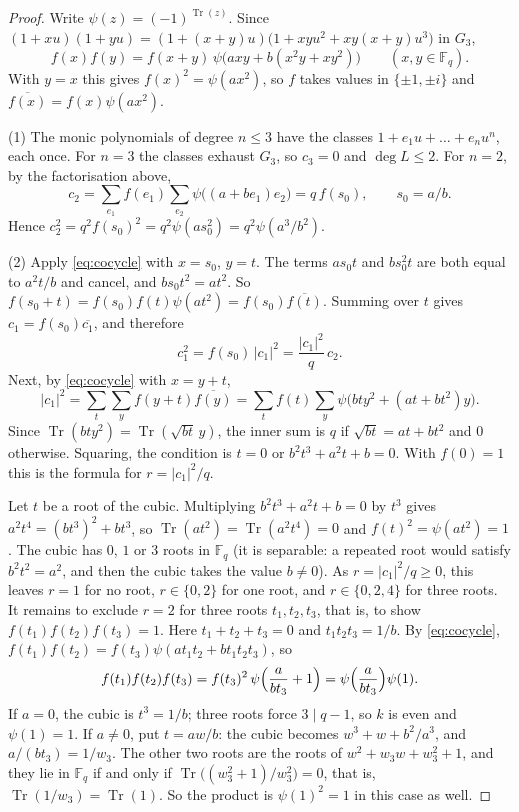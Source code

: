 \documentclass[11pt,a4paper]{amsart}
\theoremstyle{definition}
\theoremstyle{remark}
\newcommand{\F}{\mathbb{F}}
\newcommand{\Tr}{\operatorname{Tr}}
\begin{document}
\begin{proof}
Write $\psi(z)=(-1)^{\Tr(z)}$. Since
$(1+xu)(1+yu)=(1+(x+y)u)\bigl(1+xyu^2+xy(x+y)u^3\bigr)$ in $G_3$,
\begin{equation}\label{eq:cocycle}
f(x)f(y)=f(x+y)\,\psi\bigl(axy+b(x^2y+xy^2)\bigr)\qquad(x,y\in\F_q).
\end{equation}
With $y=x$ this gives $f(x)^2=\psi(ax^2)$, so $f$ takes values in $\{\pm1,\pm i\}$ and $\overline{f(x)}=f(x)\psi(ax^2)$.

(1) The monic polynomials of degree $n\le3$ have the classes $1+e_1u+\dots+e_nu^n$, each once. For $n=3$ the classes
exhaust $G_3$, so $c_3=0$ and $\deg L\le2$. For $n=2$, by the factorisation above,
\[
c_2=\sum_{e_1}f(e_1)\sum_{e_2}\psi\bigl((a+be_1)e_2\bigr)=q\,f(s_0),\qquad s_0=a/b .
\]
Hence $c_2^2=q^2f(s_0)^2=q^2\psi(as_0^2)=q^2\psi(a^3/b^2)$.

(2) Apply \eqref{eq:cocycle} with $x=s_0$, $y=t$. The terms $as_0t$ and $bs_0^2t$ are both equal to $a^2t/b$ and
cancel, and $bs_0t^2=at^2$. So $f(s_0+t)=f(s_0)f(t)\psi(at^2)=f(s_0)\overline{f(t)}$. Summing over $t$ gives
$c_1=f(s_0)\overline{c_1}$, and therefore
\[
c_1^2=f(s_0)\,|c_1|^2=\frac{|c_1|^2}{q}\,c_2 .
\]
Next, by \eqref{eq:cocycle} with $x=y+t$,
\[
|c_1|^2=\sum_{t}\sum_yf(y+t)\overline{f(y)}=\sum_tf(t)\sum_y\psi\bigl(bty^2+(at+bt^2)y\bigr).
\]
Since $\Tr(bty^2)=\Tr(\sqrt{bt}\,y)$, the inner sum is $q$ if $\sqrt{bt}=at+bt^2$ and $0$ otherwise. Squaring, the
condition is $t=0$ or $b^2t^3+a^2t+b=0$. With $f(0)=1$ this is the formula for $r=|c_1|^2/q$.

Let $t$ be a root of the cubic. Multiplying $b^2t^3+a^2t+b=0$ by $t^3$ gives $a^2t^4=(bt^3)^2+bt^3$, so
$\Tr(at^2)=\Tr(a^2t^4)=0$ and $f(t)^2=\psi(at^2)=1$. The cubic has $0$, $1$ or $3$ roots in $\F_q$ (it is separable: a repeated
root would satisfy $b^2t^2=a^2$, and then the cubic takes the value $b\ne0$). As $r=|c_1|^2/q\ge0$, this leaves $r=1$ for no root, $r\in\{0,2\}$ for one root, and
$r\in\{0,2,4\}$ for three roots. It remains to exclude $r=2$ for three roots $t_1,t_2,t_3$, that is, to show
$f(t_1)f(t_2)f(t_3)=1$. Here $t_1+t_2+t_3=0$ and $t_1t_2t_3=1/b$. By \eqref{eq:cocycle},
$f(t_1)f(t_2)=f(t_3)\psi(at_1t_2+bt_1t_2t_3)$, so
\[
f(t_1)f(t_2)f(t_3)=f(t_3)^2\,\psi\Bigl(\frac{a}{bt_3}+1\Bigr)=\psi\Bigl(\frac{a}{bt_3}\Bigr)\psi(1).
\]
If $a=0$, the cubic is $t^3=1/b$; three roots force $3\mid q-1$, so $k$ is even and $\psi(1)=1$. If $a\ne0$, put
$t=aw/b$: the cubic becomes $w^3+w+b^2/a^3$, and $a/(bt_3)=1/w_3$. The other two roots are the roots of
$w^2+w_3w+w_3^2+1$, and they lie in $\F_q$ if and only if $\Tr\bigl((w_3^2+1)/w_3^2\bigr)=0$, that is,
$\Tr(1/w_3)=\Tr(1)$. So the product is $\psi(1)^2=1$ in this case as well.


\end{proof}
\end{document}
